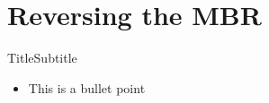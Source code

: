 
\section{Reversing the MBR}

\begin{frame}{Title}{Subtitle}
    \begin{itemize}
        \item This is a bullet point
    \end{itemize}
\end{frame}
